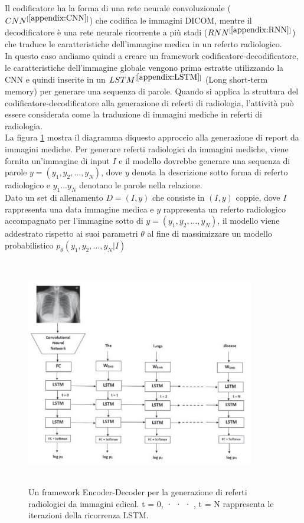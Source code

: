 \documentclass[12pt,a4paper]{report}
\begin{document}
Il codificatore ha la forma di una rete neurale convoluzionale ($CNN^{[\ref{appendix:CNN}]}$) che codifica le immagini DICOM, mentre il decodificatore è una rete neurale ricorrente a più stadi ($RNN^{[\ref{appendix:RNN}]}$) che traduce le caratteristiche dell'immagine medica in un referto radiologico.\\
In questo caso andiamo quindi a creare un framework codificatore-decodificatore, le caratteristiche dell'immagine globale vengono prima estratte utilizzando la CNN e quindi inserite in un $LSTM^{[\ref{appendix:LSTM}]}$ (Long short-term memory) per generare una sequenza di parole. Quando si applica la struttura del codificatore-decodificatore alla generazione di referti di radiologia, l'attività può essere considerata come la traduzione di immagini mediche in referti di radiologia.\\
La figura \ref{fig:LSTM} mostra il diagramma diquesto approccio alla generazione di report da immagini mediche. Per generare referti radiologici da immagini mediche, viene fornita un'immagine di input $I$ e il modello dovrebbe generare una sequenza di parole $y = (y_1, y_2, . . . ,y_N)$, dove $y$ denota la descrizione sotto forma di referto radiologico e $y_1 . . .y_N$ denotano le parole nella relazione.\\
Dato un set di allenamento $D = (I, y)$ che consiste in $(I, y)$ coppie, dove $I$ rappresenta una data immagine medica e $y$ rappresenta un referto radiologico accompagnato per l'immagine sotto di $y = (y_1, y_2, . . . ,y_N)$, il modello viene addestrato rispetto ai suoi parametri $\theta$ al fine di massimizzare un modello probabilistico $p_{\theta}(y_1, y_2, . . . , y_N|I)$

\begin{figure}[h!]
    \begin{center}
        \includegraphics[width=10cm,height=10cm,keepaspectratio]{LSTM}
    \end{center}
    \caption{Un framework Encoder-Decoder per la generazione di referti radiologici da immagini edical. t = 0, · · · , t = N rappresenta le iterazioni della ricorrenza LSTM.}
    \label{fig:LSTM}
\end{figure}
\end{document}
